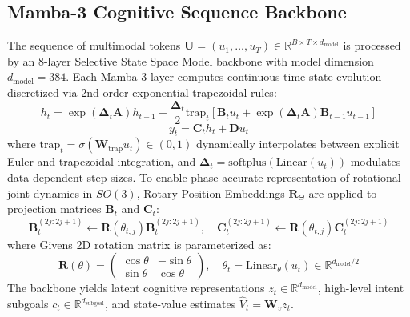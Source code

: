 \documentclass{article}
\begin{document}
\subsection{Mamba-3 Cognitive Sequence Backbone}
The sequence of multimodal tokens $\mathbf{U} = (u_1, \dots, u_T) \in \mathbb{R}^{B \times T \times d_{\text{model}}}$ is processed by an 8-layer Selective State Space Model backbone with model dimension $d_{\text{model}} = 384$. Each Mamba-3 layer computes continuous-time state evolution discretized via 2nd-order exponential-trapezoidal rules:
\begin{equation}
    h_t = \exp(\mathbf{\Delta}_t \mathbf{A}) h_{t-1} + \frac{\mathbf{\Delta}_t}{2} \text{trap}_t \left[ \mathbf{B}_t u_t + \exp(\mathbf{\Delta}_t \mathbf{A}) \mathbf{B}_{t-1} u_{t-1} \right]
\end{equation}
\begin{equation}
    y_t = \mathbf{C}_t h_t + \mathbf{D} u_t
\end{equation}
where $\text{trap}_t = \sigma(\mathbf{W}_{\text{trap}} u_t) \in (0, 1)$ dynamically interpolates between explicit Euler and trapezoidal integration, and $\mathbf{\Delta}_t = \text{softplus}(\text{Linear}(u_t))$ modulates data-dependent step sizes. To enable phase-accurate representation of rotational joint dynamics in $SO(3)$, Rotary Position Embeddings $\mathbf{R}_{\Theta}$ are applied to projection matrices $\mathbf{B}_t$ and $\mathbf{C}_t$:
\begin{equation}
    \mathbf{B}_t^{(2j:2j+1)} \leftarrow \mathbf{R}(\theta_{t, j}) \mathbf{B}_t^{(2j:2j+1)}, \quad \mathbf{C}_t^{(2j:2j+1)} \leftarrow \mathbf{R}(\theta_{t, j}) \mathbf{C}_t^{(2j:2j+1)}
\end{equation}
where Givens 2D rotation matrix is parameterized as:
\begin{equation}
    \mathbf{R}(\theta) = \begin{pmatrix} \cos\theta & -\sin\theta \\ \sin\theta & \cos\theta \end{pmatrix}, \quad \theta_t = \text{Linear}_\theta(u_t) \in \mathbb{R}^{d_{\text{model}}/2}
\end{equation}
The backbone yields latent cognitive representations $z_t \in \mathbb{R}^{d_{\text{model}}}$, high-level intent subgoals $c_t \in \mathbb{R}^{d_{\text{subgoal}}}$, and state-value estimates $\hat{V}_t = \mathbf{W}_v z_t$.
\end{document}

